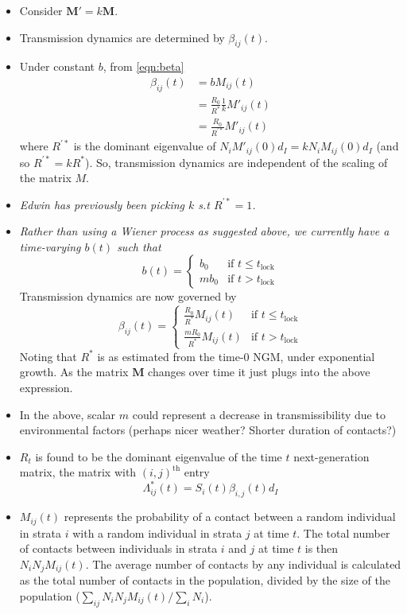 \documentclass{article}
\renewcommand{\vec}[1]{\boldsymbol{{#1}}}
\begin{document}
\begin{itemize}
\item Consider $\vec{M}' = k\vec{M}$.
\item Transmission dynamics are determined by $\beta_{ij}(t)$.
\item Under constant $b$, from \eqref{eqn:beta}
  \begin{align*}
    \beta_{ij}(t) &= b M_{ij}(t)\\
    &= \frac{R_0}{R^*} \frac{1}{k} M'_{ij}(t)\\
    &= \frac{R_0}{R^{'*}} M'_{ij}(t)
  \end{align*}
  where $R^{'*}$ is the dominant eigenvalue of $N_i M'_{ij}(0) d_I = k N_i M_{ij}(0) d_I$ (and so $R^{'*} = kR^*$). So, transmission dynamics are independent of the scaling of the matrix $M$.
\item {\it Edwin has previously been picking $k$ s.t $R^{'*} = 1$.}
\item {\it Rather than using a Wiener process as suggested above, we currently have a time-varying $b(t)$ such that}
  \begin{equation*}
    b(t) = \begin{cases} b_0 & \text{if $t \leq t_{\textrm{lock}}$} \\
    m b_0 & \text{if $t > t_{\textrm{lock}}$}\end{cases}
  \end{equation*}
  Transmission dynamics are now governed by
  \begin{equation*}
    \beta_{ij}(t) = \begin{cases} \frac{R_0}{R^*}M_{ij}(t) & \text{if $t \leq t_{\textrm{lock}}$} \\
    \frac{mR_0}{R^*}M_{ij}(t) & \text{if $t > t_{\textrm{lock}}$}\end{cases}
  \end{equation*}
  Noting that $R^*$ is as estimated from the time-0 NGM, under exponential growth. As the matrix $\vec{M}$ changes over time it just plugs into the above expression.
\item In the above, scalar $m$ could represent a decrease in transmissibility due to environmental factors (perhaps nicer weather? Shorter duration of contacts?)
\item $R_t$ is found to be the dominant eigenvalue of the time $t$ next-generation matrix, the matrix with $(i,j)^{\textrm{th}}$ entry
  \begin{equation*}
    \Lambda^*_{ij}(t) = S_i(t) \beta_{i,j}(t) d_I
  \end{equation*}
\item {$M_{ij}(t)$ represents the probability of a contact between a random individual in strata $i$ with a random individual in strata $j$ at time $t$. The total number of contacts between individuals in strata $i$ and $j$ at time $t$ is then  $N_iN_jM_{ij}(t)$. The average number of contacts by any individual is calculated as the total number of contacts in the population, divided by the size of the population ($\sum_{ij}N_iN_jM_{ij}(t)/\sum_iN_i$).}
\end{itemize}
\end{document}
